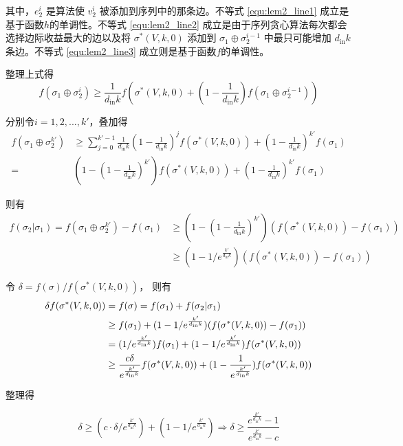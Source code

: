 其中，$e_2^i$ 是算法使 $v_2^i$ 被添加到序列中的那条边。不等式 \ref{equ:lem2_line1} 成立是基于函数$h$的单调性。不等式 \ref{equ:lem2_line2} 成立是由于序列贪心算法每次都会选择边际收益最大的边以及将 $\sigma^*(V,k,0)$ 添加到 $\sigma_1 \oplus \sigma_2^{i-1}$ 中最只可能增加 $d_{\text{in}}k$ 条边。不等式 \ref{equ:lem2_line3} 成立则是基于函数$f$的单调性。

整理上式得
\begin{equation}
    f(\sigma_1 \oplus \sigma_2^i) \ge \frac{1}{d_{\text{in}}k} f(\sigma^*(V,k,0) + (1-\frac{1}{d_{\text{in}}k}) f(\sigma_1 \oplus \sigma_2^{i-1}))
\end{equation}

分别令$i= 1,2,...,k'$，叠加得
\begin{align}
    f(\sigma_1 \oplus \sigma_2^{k'}) &\ge \sum_{j=0}^{k'-1}\frac{1}{d_{\text{in}}k}(1-\frac{1}{d_{\text{in}}k})^j f(\sigma^*(V,k,0)) + (1-\frac{1}{d_{\text{in}}k})^{k'} f(\sigma_1) \\
    =& (1-(1- \frac{1}{d_{\text{in}}k})^{k'})f(\sigma^*(V,k,0)) + (1-\frac{1}{d_{\text{in}}k})^{k'} f(\sigma_1)
\end{align}

则有
\begin{align}
    f(\sigma_2 | \sigma_1) = f(\sigma_1 \oplus \sigma_2^{k'}) - f(\sigma_1) & \ge (1-(1- \frac{1}{d_{\text{in}}k})^{k'})(f(\sigma^*(V,k,0)) - f(\sigma_1)) \\
    & \ge (1-1/e^{\frac{k'}{d_{\text{in}}k}})(f(\sigma^*(V,k,0)) - f(\sigma_1))
\end{align}

令 $\delta = f(\sigma) /f(\sigma^*(V,k,0))$， 则有
\begin{align}
\small
\delta f(\sigma^*(V,k,0)) &= f(\sigma) = f(\sigma_1)+f(\sigma_2|\sigma_1) \\ &\ge f(\sigma_1) + (1-1/e^{\frac{k'}{d_{\text{in}}k}})(f(\sigma^*(V,k,0)) - f(\sigma_1)) \\
& = (1/e^{\frac{k'}{d_{\text{in}}k}}) f(\sigma_1) + (1-1/e^{\frac{k'}{d_{\text{in}}k}})f(\sigma^*(V,k,0)) \\ &\ge \frac{c\delta}{e^{\frac{k'}{d_{\text{in}}k}}} f(\sigma^*(V,k,0)) + (1-\frac{1}{e^{\frac{k'}{d_{\text{in}}k}}})f(\sigma^*(V,k,0))
\end{align}

整理得

\begin{equation}
\delta \ge (c\cdot \delta/e^{\frac{k'}{d_{\text{in}}k}}) + (1-1/e^{\frac{k'}{d_{\text{in}}k}}) \Longrightarrow
\delta \ge \frac{e^{\frac{k'}{d_{\text{in}}k}}-1}{e^{\frac{k'}{d_{\text{in}}k}}-c}
\end{equation}

